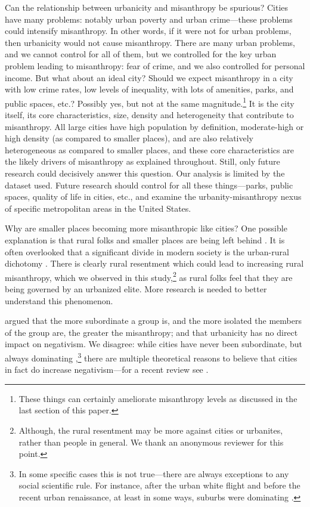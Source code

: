 \documentclass[11pt, letterpaper]{article}
\begin{document}
\begin{spacing}{1.4}
Can the relationship between urbanicity and misanthropy be spurious? Cities have many problems: notably urban poverty and urban crime---these problems could intensify misanthropy. In other words, if it were not for urban problems, then urbanicity would not cause misanthropy. There are many urban problems, and we cannot control for all of them, but we controlled for the key urban problem leading to misanthropy: fear of crime, and we also controlled for personal income. 
But what about an ideal city? Should we expect misanthropy in a city with low crime rates, low levels of inequality, with lots of amenities, parks, and public spaces, etc.? Possibly yes, but not at the same magnitude.\footnote{These things can certainly ameliorate misanthropy levels as discussed in the last section of this paper.} It is the city itself, its core characteristics, size, density and heterogeneity that contribute to misanthropy. All large cities have high population by definition, moderate-high or high density (as compared to smaller places), and are also relatively heterogeneous as compared to smaller places, and these core characteristics are the likely drivers of misanthropy as explained throughout.
%
Still, only future research could decisively  answer this question. Our analysis is limited by the dataset used. Future research should control for all these things---parks, public spaces, quality of life in cities, etc., and examine the urbanity-misanthropy nexus of specific metropolitan areas in the United States. 

Why are smaller places becoming more misanthropic like cities? One possible
explanation is that rural folks and smaller places are being left behind
\citep{aokCityBook15}. It is often overlooked that a significant divide in
modern society is the urban-rural dichotomy
\citep{hansonCityJournalautumn15,hansonCJ17winter17}. There is clearly rural
resentment which could lead to increasing rural misanthropy, which we observed
in this study,\footnote{Although, the rural resentment may be more against
  cities or urbanites, rather than people in general. We thank an anonymous
  reviewer for this point.} as rural folks feel that they are being governed by an urbanized elite. More research is needed to better understand this phenomenon.

\citet{smith97} argued that the more subordinate a group is, and the more isolated the members of the group are, the greater the misanthropy; and that urbanicity has no direct impact on negativism.  %
We disagree: while cities have never been subordinate, but always dominating \citep[e.g.,][]{aok-sizeFetish17},\footnote{In some specific cases this is not
   true---there are always exceptions to any social scientific rule. For instance, after the urban white flight and before the recent urban renaissance, at least in some ways, suburbs were dominating \citep[e.g.,][]{adams14}.} there are multiple theoretical reasons to believe that cities in fact do increase negativism---for a recent review see \citet{aokCityBook15}. 
   

\end{spacing}
\end{document}
